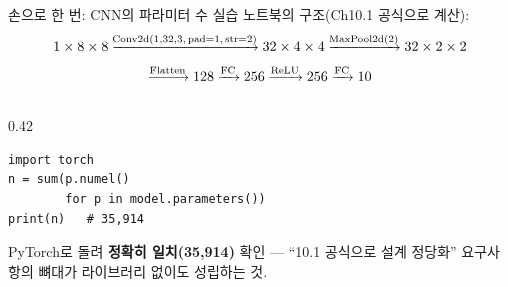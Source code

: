 \documentclass[aspectratio=169,11pt]{beamer}
\begin{document}
\begin{frame}[fragile]{손으로 한 번: CNN의 파라미터 수}
  실습 노트북의 구조(Ch10.1 공식으로 계산):
  \[
  \small 1\times8\times8
  \xrightarrow{\text{Conv2d}(1,32,3,\,\text{pad}=1,\,\text{str}=2)}
  32\times4\times4
  \xrightarrow{\text{MaxPool2d}(2)}
  32\times2\times2
  \]
  \[
  \small \xrightarrow{\text{Flatten}} 128
  \xrightarrow{\text{FC}} 256
  \xrightarrow{\text{ReLU}} 256
  \xrightarrow{\text{FC}} 10
  \]
  \small
  \begin{columns}[T]
    \begin{column}{0.42\textwidth}
      \begin{lstlisting}
import torch
n = sum(p.numel()
        for p in model.parameters())
print(n)   # 35,914
\end{lstlisting}
      {\footnotesize PyTorch로 돌려 \textbf{정확히 일치(35,914)}
      확인 — ``10.1 공식으로 설계 정당화'' 요구사항의 뼈대가
      라이브러리 없이도 성립하는 것.}
    \end{column}
  \end{columns}
\end{frame}
\end{document}
